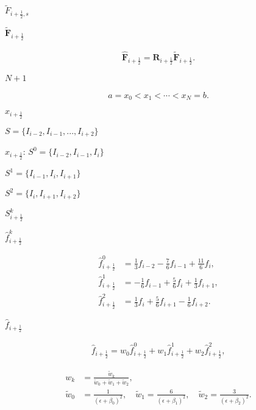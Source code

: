 \documentclass{article}
\begin{document}
$\tilde{F}_{i+\frac{1}{2},s}$
\pagebreak

$\tilde{\mathbf{F}}_{i+\frac{1}{2}}$
\pagebreak

\[ \begin{align*} \hat{\mathbf{F}}_{i+\frac{1}{2}} = \mathbf{R}_{i+\frac{1}{2}}\tilde{\mathbf{F}}_{i+\frac{1}{2}}. \end{align*} \]
\pagebreak

$N+1$
\pagebreak

\[ \begin{align*} a = x_{0} < x_{1} < \cdots < x_{N} = b. \end{align*} \]
\pagebreak

$x_{i+\frac{1}{2}}$
\pagebreak

$S = \{I_{i-2},I_{i-1},...,I_{i+2}\}$
\pagebreak

$x_{i+\frac{1}{2}}$: $S^{0} = \{I_{i-2},I_{i-1},I_{i}\}$
\pagebreak

$S^{1} = \{I_{i-1},I_{i},I_{i+1}\}$
\pagebreak

$S^{2} = \{I_{i},I_{i+1},I_{i+2}\}$
\pagebreak

$S_{i+\frac{1}{2}}^{k}$
\pagebreak

$\hat{f}_{i+\frac{1}{2}}^{k}$
\pagebreak

\[ \begin{align*} \hat{f}_{i+\frac{1}{2}}^{0} &= \frac{1}{3}f_{i-2} - \frac{7}{6}f_{i-1} + \frac{11}{6}f_{i}, \\ \hat{f}_{i+\frac{1}{2}}^{1} &= -\frac{1}{6}f_{i-1} + \frac{5}{6}f_{i} + \frac{1}{3}f_{i+1}, \\ \hat{f}_{i+\frac{1}{2}}^{2} &= \frac{1}{3}f_{i} + \frac{5}{6}f_{i+1} - \frac{1}{6}f_{i+2}. \end{align*} \]
\pagebreak

$\hat{f}_{i+\frac{1}{2}}$
\pagebreak

\[ \begin{align*} \hat{f}_{i+\frac{1}{2}} = w_{0}\hat{f}_{i+\frac{1}{2}}^{0} + w_{1}\hat{f}_{i+\frac{1}{2}}^{1} + w_{2}\hat{f}_{i+\frac{1}{2}}^{2}, \end{align*} \]
\pagebreak

\[ \begin{align*} w_{k} &= \frac{\tilde{w}_{k}}{\tilde{w}_{0}+\tilde{w}_{1}+\tilde{w}_{2}}, \\ \tilde{w}_{0} &= \frac{1}{(\epsilon+\beta_{0})^2},\quad \tilde{w}_{1} = \frac{6}{(\epsilon+\beta_{1})^2}, \quad \tilde{w}_{2} = \frac{3}{(\epsilon+\beta_{2})^2}. \end{align*} \]
\pagebreak
\end{document}
